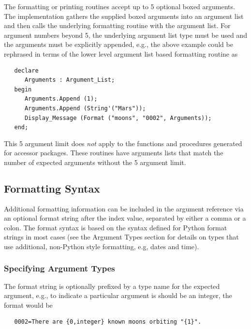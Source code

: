 The formatting or printing routines accept up to 5 optional boxed arguments.
The implementation gathers the supplied boxed arguments into an argument
list and then calls the underlying formatting routine with the argument
list.  For argument numbers beyond 5, the underlying argument list type must be
used and the arguments must be explicitly appended, e.g., the above
example could be rephrased in terms of the lower level argument list based
formatting routine as
\begin{xmpl}
\begin{verbatim}
   declare
      Arguments : Argument_List;
   begin
      Arguments.Append (1);
      Arguments.Append (String'("Mars"));
      Display_Message (Format ("moons", "0002", Arguments));
   end;
\end{verbatim}
\end{xmpl}

This 5 argument limit does \textit{not} apply to the functions and procedures
generated for accessor packages.  These routines have arguments lists that
match the number of expected arguments without the 5 argument limit.

\subsection{Formatting Syntax}

Additional formatting information can be included in the argument reference
via an optional format string after the index value, separated by either a
comma or a colon.  The format syntax is based on the syntax defined for Python
format strings in most cases (see the Argument Types section for details
on types that use additional, non-Python style formatting, e.g, dates and
time).

\subsubsection{Specifying Argument Types}

The format string is optionally prefixed by a type name for the expected
argument, e.g., to indicate a particular argument is should be an integer,
the format would be
\begin{xmpl}
\begin{verbatim}
   0002=There are {0,integer} known moons orbiting "{1}".
\end{verbatim}
\end{xmpl}

